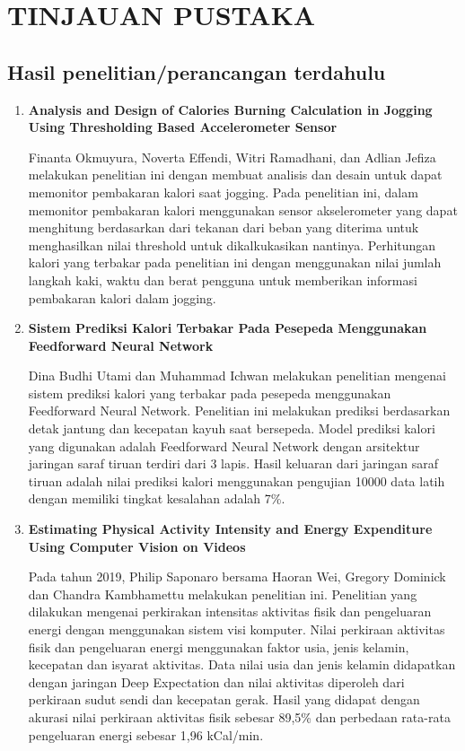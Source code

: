\section{TINJAUAN PUSTAKA}

\subsection{Hasil penelitian/perancangan terdahulu}
\begin{enumerate} [label=\textbf{\arabic*}., listparindent=2em]
  \item \textbf{Analysis and Design of Calories Burning Calculation in Jogging Using Thresholding Based Accelerometer Sensor}
  
  Finanta Okmuyura, Noverta Effendi, Witri Ramadhani, dan Adlian Jefiza melakukan penelitian ini dengan membuat analisis dan desain untuk dapat memonitor pembakaran kalori saat jogging. Pada penelitian ini, dalam memonitor pembakaran kalori menggunakan sensor akselerometer yang dapat menghitung berdasarkan dari tekanan dari beban yang diterima untuk menghasilkan nilai threshold untuk dikalkukasikan nantinya. Perhitungan kalori yang terbakar pada penelitian ini dengan menggunakan nilai jumlah langkah kaki, waktu dan berat pengguna untuk memberikan informasi pembakaran kalori dalam jogging.
  
  \item \textbf{Sistem Prediksi Kalori Terbakar Pada Pesepeda Menggunakan Feedforward Neural Network}
  
  Dina Budhi Utami dan Muhammad Ichwan melakukan penelitian mengenai sistem prediksi kalori yang terbakar pada pesepeda menggunakan Feedforward Neural Network. Penelitian ini melakukan prediksi berdasarkan detak jantung dan kecepatan kayuh saat bersepeda. Model prediksi kalori yang digunakan adalah Feedforward Neural Network dengan arsitektur jaringan saraf tiruan terdiri dari 3 lapis. Hasil keluaran dari jaringan saraf tiruan adalah nilai prediksi kalori menggunakan pengujian 10000 data latih dengan memiliki tingkat kesalahan adalah 7\%.

  \item \textbf{Estimating Physical Activity Intensity and Energy Expenditure Using Computer Vision on Videos}
  
  Pada tahun 2019, Philip Saponaro bersama Haoran Wei, Gregory Dominick dan Chandra Kambhamettu melakukan penelitian ini. Penelitian yang dilakukan mengenai perkirakan intensitas aktivitas fisik dan pengeluaran energi dengan menggunakan sistem visi komputer. Nilai perkiraan aktivitas fisik dan pengeluaran energi menggunakan faktor usia, jenis kelamin, kecepatan dan isyarat aktivitas. Data nilai usia dan jenis kelamin didapatkan dengan jaringan Deep Expectation dan nilai aktivitas diperoleh dari perkiraan sudut sendi dan kecepatan gerak. Hasil yang didapat dengan akurasi nilai perkiraan aktivitas fisik sebesar 89,5\% dan perbedaan rata-rata pengeluaran energi sebesar 1,96 kCal/min.
\end{enumerate}

